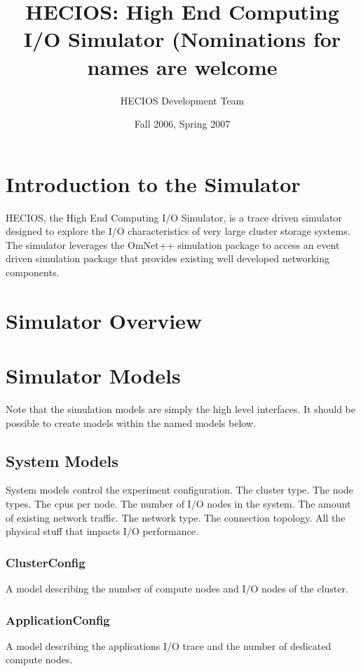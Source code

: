 \documentclass[11pt]{article}
\title{HECIOS: High End Computing I/O Simulator (Nominations for names are welcome}
\author{HECIOS Development Team}
\date{Fall 2006, Spring 2007}
\begin{document}
\maketitle

\newpage

\setcounter{tocdepth}{2}
\tableofcontents

%
%
\setlength{\parindent}{0pt}
\setlength{\parskip}{11pt}

%
%
\section{Introduction to the Simulator}
HECIOS, the High End Computing I/O Simulator, is a trace driven simulator
designed to explore the I/O characteristics of very large cluster storage
systems.  The simulator leverages the OmNet++ simulation package to access an
event driven simulation package that provides existing well developed
networking components.

\section{Simulator Overview}

\section{Simulator Models}
Note that the simulation models are simply the high level interfaces.  It
should be possible to create models within the named models below.

\subsection{System Models}
System models control the experiment configuration.  The cluster type.  The
node types.  The cpus per node.  The number of I/O nodes in the system.  The amount
of existing network traffic.  The network type.  The connection topology.  All
the physical stuff that impacts I/O performance.

\subsubsection{ClusterConfig}
A model describing the number of compute nodes and I/O nodes of the cluster.

\subsubsection{ApplicationConfig}
A model describing the applications I/O trace and the number of dedicated
compute nodes.
\end{document}
